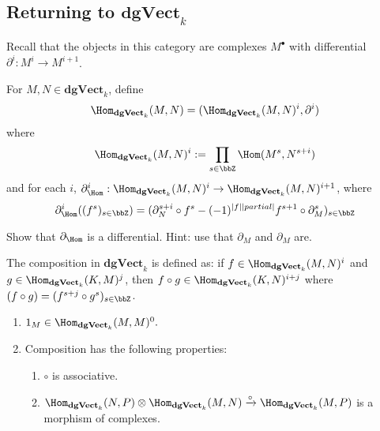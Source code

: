 \documentclass[12pt]{article}
\newcommand*{\dgVectk}{\mathbf{dgVect}_k}
\begin{document}
\subsection{Returning to $\dgVectk$}
Recall that the objects in this category are complexes $M^\bullet$ with differential $\partial^i:M^i\to M^{i+1}$.
\begin{defn}
	For $M,N\in \dgVectk$, define
	\[\Hom_{\dgVectk}(M,N)=(\Hom_{\dgVectk}(M,N)^i,\partial^i)\]
	where 
	\[\Hom_{\dgVectk}(M,N)^i:= \prod_{s\in\bbZ}\Hom(M^s,N^{s+i})\]
	and for each $i$, $\partial^i_{\Hom}:\Hom_{\dgVectk}(M,N)^i\to \Hom_{\dgVectk}(M,N)^{i+1}$, where
	\[\partial^i_{\Hom}((f^s)_{s\in\bbZ})=(\partial_N^{s+i}\circ f^s-(-1)^{|f||partial|}f^{s+1}\circ\partial_M^s)_{s\in\bbZ}\]
\end{defn}
\begin{prob}
	Show that $\partial_{\Hom}$ is a differential. Hint: use that $\partial_M$ and $\partial_M$ are.
\end{prob}
\begin{rmk}
	The composition in $\dgVectk$ is defined as: if $f\in\Hom_{\dgVectk}(M,N)^i$ and $g\in\Hom_{\dgVectk}(K,M)^j$,
	then $f\circ g\in\Hom_{\dgVectk}(K,N)^{i+j}$ where $(f\circ g)=(f^{s+j}\circ g^s)_{s\in\bbZ}$.


\end{rmk}
\begin{lem}
	\begin{enumerate}
		\item $1_M\in\Hom_{\dgVectk}(M,M)^0.$
		\item Composition has the following properties:
		\begin{enumerate}
			\item $\circ$ is associative.
			\item $\Hom_{\dgVectk}(N,P)\otimes \Hom_{\dgVectk}(M,N)\xrightarrow{\circ} \Hom_{\dgVectk}(M,P)$
			is a morphism of complexes. 
		\end{enumerate}
	\end{enumerate}
\end{lem}
\end{document}
